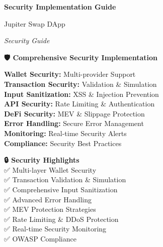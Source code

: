 \documentclass[11pt,a4paper]{article}
\begin{document}
\begin{titlepage}
    \centering
    \vspace*{1cm}
    
    {\Huge\textbf{\textcolor{jupiterBlue}{Security Implementation Guide}}\par}
    \vspace{0.5cm}
    {\LARGE\textcolor{deauraPurple}{Jupiter Swap DApp}\par}
    \vspace{0.3cm}
    {\Large\textit{Security Guide}\par}
    
    \vspace{1.5cm}
    
    \begin{tcolorbox}[colback=errorRed!10,colframe=errorRed,width=0.9\textwidth]
        \centering
        \textbf{🛡️ Comprehensive Security Implementation}\\
        \vspace{0.5cm}
        \begin{multicols}{2}
        \textbf{Wallet Security:} Multi-provider Support\\
        \textbf{Transaction Security:} Validation \& Simulation\\
        \textbf{Input Sanitization:} XSS \& Injection Prevention\\
        \textbf{API Security:} Rate Limiting \& Authentication\\
        \textbf{DeFi Security:} MEV \& Slippage Protection\\
        \textbf{Error Handling:} Secure Error Management\\
        \textbf{Monitoring:} Real-time Security Alerts\\
        \textbf{Compliance:} Security Best Practices
        \end{multicols}
    \end{tcolorbox}
    
    \vspace{1.5cm}
    
    \begin{tcolorbox}[colback=successGreen!10,colframe=successGreen,width=0.8\textwidth]
        \centering
        \textbf{🔒 Security Highlights}\\
        \vspace{0.3cm}
        ✅ Multi-layer Wallet Security\\
        ✅ Transaction Validation \& Simulation\\
        ✅ Comprehensive Input Sanitization\\
        ✅ Advanced Error Handling\\
        ✅ MEV Protection Strategies\\
        ✅ Rate Limiting \& DDoS Protection\\
        ✅ Real-time Security Monitoring\\
        ✅ OWASP Compliance
    \end{tcolorbox}
    

\end{titlepage}
\end{document}
